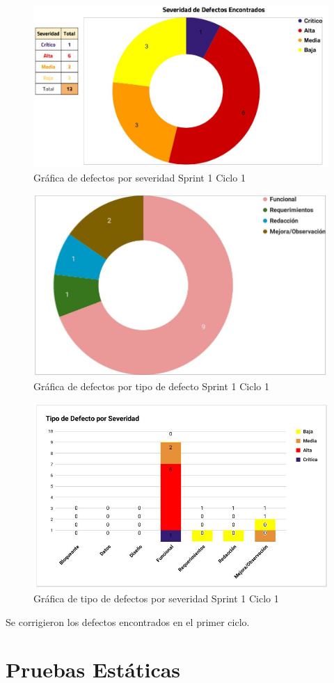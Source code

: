 \newpage

\begin{figure}[H]
	\begin{center}
		\includegraphics[width=.85\textwidth]{images/pruebas/s1c1-1}
		\caption{Gráfica de defectos por severidad Sprint 1 Ciclo 1}
		\label{fig:infos1c1-1}
	\end{center}
\end{figure}

\begin{figure}[H]
	\begin{center}
		\includegraphics[width=.75\textwidth]{images/pruebas/s1c1-2}
		\caption{Gráfica de defectos por tipo de defecto Sprint 1 Ciclo 1}
		\label{fig:infos1c1-2}
	\end{center}
\end{figure}

\newpage

\begin{figure}[H]
	\begin{center}
		\includegraphics[width=.95\textwidth]{images/pruebas/s1c1-3}
		\caption{Gráfica de tipo de defectos por severidad Sprint 1 Ciclo 1}
		\label{fig:infos1c1-3}
	\end{center}
\end{figure}

Se corrigieron los defectos encontrados en el primer ciclo.

\section{Pruebas Estáticas}
